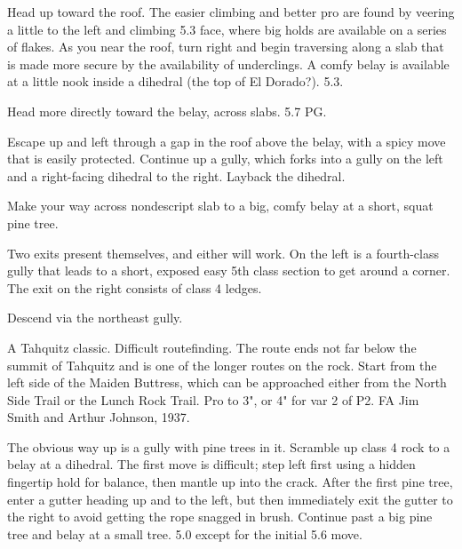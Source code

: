 \documentclass{tahquitz}
\begin{document}
 Head up toward the roof. The easier climbing and better pro are found
by veering a little to the left and climbing 5.3 face, where big holds are available on a series of flakes.
As you near the roof, turn right and begin traversing
along a slab that is made more secure by the availability of underclings. A comfy
belay is available at a little nook inside a dihedral (the top of El Dorado?). 5.3.

 Head more directly toward the belay, across slabs. 5.7 PG.

 Escape up and left through a gap in the roof above the belay, with a spicy move
that is easily protected. Continue up a gully, which forks into a gully on the left and a right-facing
dihedral to the right. Layback the dihedral.

 Make your way across nondescript slab to a big, comfy belay at a short, squat pine tree.

 Two exits present themselves, and either will work. On the left is a fourth-class
gully that leads to a short, exposed easy 5th class section to get around a corner.
The exit on the right consists of class 4 ledges.

Descend via the northeast gully.





A Tahquitz classic. Difficult routefinding. The route ends not far
below the summit of Tahquitz and is one of the longer routes on the
rock. Start from the left side of the Maiden Buttress, which can be
approached either from the North Side Trail or the Lunch Rock Trail.
Pro to 3", or 4" for var 2 of P2.
FA Jim Smith and Arthur Johnson, 1937.

 The obvious way up is a gully with pine trees in it. Scramble up
class 4 rock to a belay at a dihedral. The first move is difficult;
step left first using a hidden fingertip hold for balance, then mantle
up into the crack.
After the first pine tree, enter a gutter heading up
and to the left, but then immediately exit the gutter to the right to
avoid getting the rope snagged in brush. Continue past a big pine
tree and belay at a small tree. 5.0 except for the initial 5.6
move.
\end{document}

